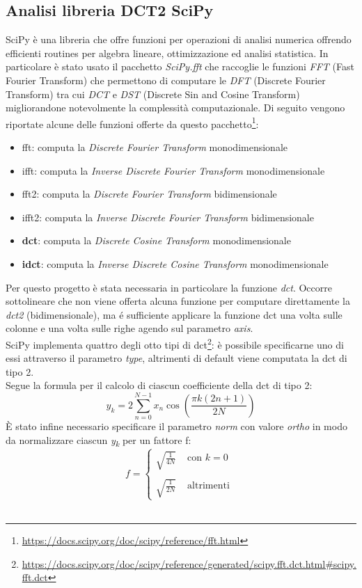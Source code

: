 \subsection{Analisi libreria DCT2 SciPy}\label{libScipy}
SciPy è una libreria che offre funzioni per operazioni di analisi numerica offrendo efficienti routines per algebra lineare, ottimizzazione ed analisi statistica.
In particolare è stato usato il pacchetto \emph{SciPy.fft} che raccoglie le funzioni \emph{FFT} (Fast Fourier Transform) che permettono di computare le \emph{DFT} (Discrete Fourier Transform) tra cui \emph{DCT} e \emph{DST} (Discrete Sin and Cosine Transform) migliorandone notevolmente la complessità computazionale.
Di seguito vengono riportate alcune delle funzioni offerte da questo pacchetto\footnote{\url{https://docs.scipy.org/doc/scipy/reference/fft.html}}:
\begin{itemize}
    \item fft: computa la \emph{Discrete Fourier Transform} monodimensionale
    \item ifft: computa la \emph{Inverse Discrete Fourier Transform} monodimensionale
    \item fft2: computa la \emph{Discrete Fourier Transform} bidimensionale
    \item ifft2: computa la \emph{Inverse Discrete Fourier Transform} bidimensionale
    \item \textbf{dct}: computa la \emph{Discrete Cosine Transform} monodimensionale
    \item \textbf{idct}: computa la \emph{Inverse Discrete Cosine Transform} monodimensionale
\end{itemize}
Per questo progetto è stata necessaria in particolare la funzione \emph{dct}.
Occorre sottolineare che non viene offerta alcuna funzione per computare direttamente la \emph{dct2} (bidimensionale), ma é sufficiente applicare la funzione dct una volta sulle colonne e una volta sulle righe agendo sul parametro \emph{axis}.\\
SciPy implementa quattro degli otto tipi di dct\footnote{\url{https://docs.scipy.org/doc/scipy/reference/generated/scipy.fft.dct.html\#scipy.fft.dct}}: è possibile specificarne uno di essi attraverso il parametro \emph{type}, altrimenti di default viene computata la dct di tipo 2.\\
Segue la formula per il calcolo di ciascun coefficiente della dct di tipo 2:
\[y_{k} = 2\sum_{n=0}^{N-1}x_{n}\cos\left ( \frac{\pi k\left ( 2n + 1 \right )  }{2N} \right )\]
È stato infine necessario specificare il parametro \emph{norm} con valore \emph{ortho} in modo da normalizzare ciascun \emph{y\textsubscript{k}} per un fattore f:\\
\[
    f=
    \begin{cases}
    \sqrt{\frac{1}{4N}} & \text{ con } k=0\\\\
    \sqrt{\frac{1}{2N}} & \text{ altrimenti }
    \end{cases}    
    \]\\

